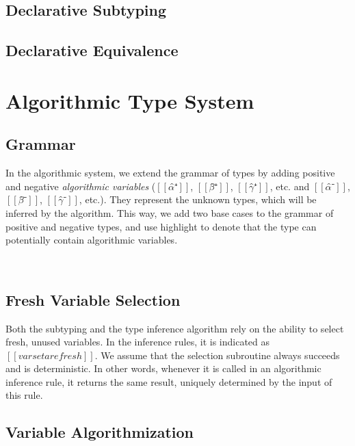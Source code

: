 \documentclass[a4,natbib=false]{article}
\begin{document}
\subsection{Declarative Subtyping}
\ottdefnsDOne

\subsection{Declarative Equivalence}
\ottdefnsEOne

\section{Algorithmic Type System}

\subsection{Grammar}

In the algorithmic system, we extend the grammar of types
by adding positive and negative \emph{algorithmic variables}
($[[α̂⁺]]$, $[[β̂⁺]]$, $[[γ̂⁺]]$, etc. and $[[α̂⁻]]$, $[[β̂⁻]]$, $[[γ̂⁻]]$, etc.).
They represent the unknown types, which will be inferred by the algorithm.
This way, we add two base cases to the grammar of 
positive and negative types, and use highlight to denote that the type
can potentially contain algorithmic variables.

 
\begin{definition}
  \hfill \\
\ottgrammartabular{
  \ottuP\ottinterrule
  \ottuN\ottinterrule
}
\end{definition}

\subsection{Fresh Variable Selection}
\label{sec:fresh-selection}
Both the subtyping and the type inference algorithm
rely on the ability to select fresh, unused variables.
In the inference rules, it is indicated as 
$[[{varset} are fresh]]$. 
We assume that the selection subroutine always succeeds and is 
deterministic. In other words, whenever it is called in 
an algorithmic inference rule, it returns the same result, 
uniquely determined by the input of this rule.

\subsection{Variable Algorithmization}
\end{document}
